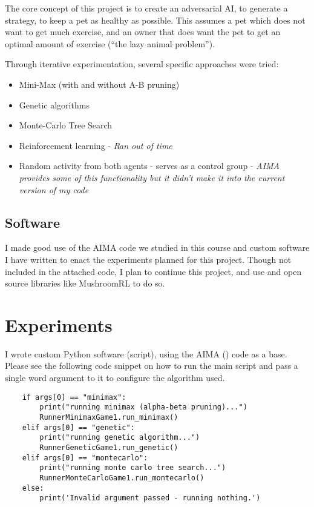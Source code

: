 \documentclass{article}
\begin{document}
The core concept of this project is to create an adversarial AI, to generate a strategy, to keep a pet as healthy as possible. This assumes a pet which does not want to get much exercise, and an owner that does want the pet to get an optimal amount of exercise (``the lazy animal problem'').

Through iterative experimentation, several specific approaches were tried:
\begin{itemize}
    \item Mini-Max (with and without A-B pruning)
    \item Genetic algorithms
    \item Monte-Carlo Tree Search
    \item Reinforcement learning - \textit{Ran out of time}
    \item Random activity from both agents - serves as a control group - \textit{AIMA provides some of this functionality but it didn't make it into the current version of my code}
\end{itemize}

\subsection{Software}
  I made good use of the AIMA code we studied in this course and custom software I have written to enact the experiments planned for this project. 
  Though not included in the attached code, I plan to continue this project, and use and open source libraries like MushroomRL to do so.\cite{mushroom}

\section{Experiments}

I wrote custom Python software (script), using the AIMA (\cite{russell2016artificial}) code as a base. Please see the following code snippet on how to run the main script and pass a single word argument to it to configure the algorithm used.

\begin{lstlisting}
    if args[0] == "minimax":
        print("running minimax (alpha-beta pruning)...")
        RunnerMinimaxGame1.run_minimax()
    elif args[0] == "genetic":
        print("running genetic algorithm...")
        RunnerGeneticGame1.run_genetic()
    elif args[0] == "montecarlo":
        print("running monte carlo tree search...")
        RunnerMonteCarloGame1.run_montecarlo()
    else:
        print('Invalid argument passed - running nothing.')
\end{lstlisting}
\end{document}
